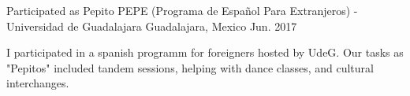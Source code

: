 \begin{cventries}
  \cventry
    {Participated as Pepito}
    {PEPE (Programa de Español Para Extranjeros) - Universidad de Guadalajara}
    {Guadalajara, Mexico}
    {Jun. 2017}
    {
      \begin{cvitems}
        \item {I participated in a spanish programm for foreigners hosted by UdeG. Our tasks as "Pepitos" included tandem sessions, helping with dance classes, and cultural interchanges.}
      \end{cvitems}
    }
\end{cventries}
